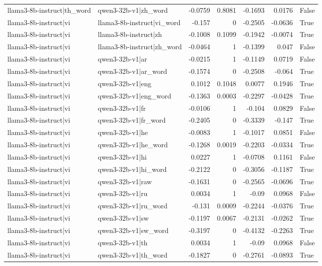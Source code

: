 \begin{table}
\begin{tabular}{l l r r r r l}
llama3-8b-instruct|th_word & qwen3-32b-v1|zh_word & -0.0759 & 0.8081 & -0.1693 & 0.0176 & False \\
llama3-8b-instruct|vi & llama3-8b-instruct|vi_word & -0.157 & 0 & -0.2505 & -0.0636 & True \\
llama3-8b-instruct|vi & llama3-8b-instruct|zh & -0.1008 & 0.1099 & -0.1942 & -0.0074 & True \\
llama3-8b-instruct|vi & llama3-8b-instruct|zh_word & -0.0464 & 1 & -0.1399 & 0.047 & False \\
llama3-8b-instruct|vi & qwen3-32b-v1|ar & -0.0215 & 1 & -0.1149 & 0.0719 & False \\
llama3-8b-instruct|vi & qwen3-32b-v1|ar_word & -0.1574 & 0 & -0.2508 & -0.064 & True \\
llama3-8b-instruct|vi & qwen3-32b-v1|eng & 0.1012 & 0.1048 & 0.0077 & 0.1946 & True \\
llama3-8b-instruct|vi & qwen3-32b-v1|eng_word & -0.1363 & 0.0003 & -0.2297 & -0.0428 & True \\
llama3-8b-instruct|vi & qwen3-32b-v1|fr & -0.0106 & 1 & -0.104 & 0.0829 & False \\
llama3-8b-instruct|vi & qwen3-32b-v1|fr_word & -0.2405 & 0 & -0.3339 & -0.147 & True \\
llama3-8b-instruct|vi & qwen3-32b-v1|he & -0.0083 & 1 & -0.1017 & 0.0851 & False \\
llama3-8b-instruct|vi & qwen3-32b-v1|he_word & -0.1268 & 0.0019 & -0.2203 & -0.0334 & True \\
llama3-8b-instruct|vi & qwen3-32b-v1|hi & 0.0227 & 1 & -0.0708 & 0.1161 & False \\
llama3-8b-instruct|vi & qwen3-32b-v1|hi_word & -0.2122 & 0 & -0.3056 & -0.1187 & True \\
llama3-8b-instruct|vi & qwen3-32b-v1|raw & -0.1631 & 0 & -0.2565 & -0.0696 & True \\
llama3-8b-instruct|vi & qwen3-32b-v1|ru & 0.0034 & 1 & -0.09 & 0.0968 & False \\
llama3-8b-instruct|vi & qwen3-32b-v1|ru_word & -0.131 & 0.0009 & -0.2244 & -0.0376 & True \\
llama3-8b-instruct|vi & qwen3-32b-v1|sw & -0.1197 & 0.0067 & -0.2131 & -0.0262 & True \\
llama3-8b-instruct|vi & qwen3-32b-v1|sw_word & -0.3197 & 0 & -0.4132 & -0.2263 & True \\
llama3-8b-instruct|vi & qwen3-32b-v1|th & 0.0034 & 1 & -0.09 & 0.0968 & False \\
llama3-8b-instruct|vi & qwen3-32b-v1|th_word & -0.1827 & 0 & -0.2761 & -0.0893 & True \\

\end{tabular}
\end{table}
